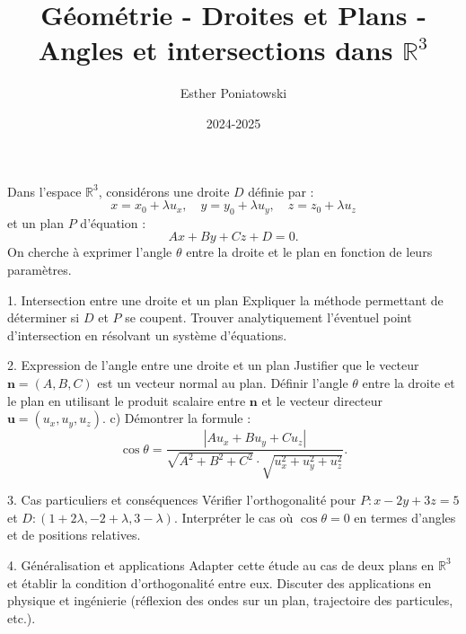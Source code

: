 \documentclass[10pt,a4paper]{article}
\title{Géométrie - Droites et Plans - Angles et intersections dans $\mathbb{R}^3$}
\author{Esther Poniatowski}
\date{2024-2025}
\begin{document}
\maketitle

Dans l'espace $\mathbb{R}^3$, considérons une droite $D$ définie par :
$$
x = x_0 + \lambda u_x, \quad y = y_0 + \lambda u_y, \quad z = z_0 + \lambda u_z
$$
et un plan $P$ d'équation :
$$
Ax + By + Cz + D = 0.
$$
On cherche à exprimer l'angle $\theta$ entre la droite et le plan en fonction de leurs paramètres.

1. Intersection entre une droite et un plan
  \ql Expliquer la méthode permettant de déterminer si $D$ et $P$ se coupent.
  \ql Trouver analytiquement l'éventuel point d'intersection en résolvant un système d'équations.

2. Expression de l'angle entre une droite et un plan
  \ql Justifier que le vecteur $\mathbf{n} = (A,B,C)$ est un vecteur normal au plan.
  \ql Définir l'angle $\theta$ entre la droite et le plan en utilisant le produit scalaire entre $\mathbf{n}$ et le vecteur directeur $\mathbf{u} = (u_x, u_y, u_z)$.
   c) Démontrer la formule :
   $$
   \cos \theta = \frac{|A u_x + B u_y + C u_z|}{\sqrt{A^2 + B^2 + C^2} \cdot \sqrt{u_x^2 + u_y^2 + u_z^2}}.
   $$

3. Cas particuliers et conséquences
  \ql Vérifier l'orthogonalité pour $P : x - 2y + 3z = 5$ et $D : (1+2\lambda, -2+\lambda, 3-\lambda)$.
  \ql Interpréter le cas où $\cos \theta = 0$ en termes d'angles et de positions relatives.

4. Généralisation et applications
  \ql Adapter cette étude au cas de deux plans en $\mathbb{R}^3$ et établir la condition d'orthogonalité entre eux.
  \ql Discuter des applications en physique et ingénierie (réflexion des ondes sur un plan, trajectoire des particules, etc.).
\end{document}
